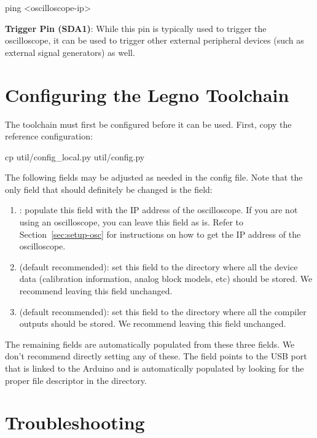 \begin{snippet}
ping <oscilloscope-ip>
\end{snippet}

\noindent\textbf{Trigger Pin (SDA1)}: While this pin is typically used to
trigger the oscilloscope, it can be used to trigger other external peripheral
devices (such as external signal generators) as well. 


\section{Configuring the Legno Toolchain}

The \legno toolchain must first be configured before it can be used. First, copy
the reference configuration:

\begin{snippet}
cp util/config_local.py util/config.py
\end{snippet}

The following fields may be adjusted as needed in the config file. Note that the
only field that should definitely be changed is the  field:

\begin{enumerate}
\item {}: populate this field with the IP address of the oscilloscope.
  If you are not using an oscilloscope, you can leave this field as is. Refer
  to Section~\ref{sec:setup-osc} for instructions on how to get the IP address
  of the oscilloscope.
\item{} (default recommended): set this field to the directory where all the device
  data (calibration information, analog block models, etc) should be stored. We
  recommend leaving this field unchanged.
\item{} (default recommended): set this field to the directory where all the compiler
  outputs should be stored. We recommend leaving this field unchanged.
\end{enumerate}

The remaining fields are automatically populated from these three fields. We
don't recommend directly setting any of these. The  field
points to the USB port that is linked to the Arduino and is automatically
populated by looking for the proper file descriptor in the  directory.


\section{Troubleshooting}

